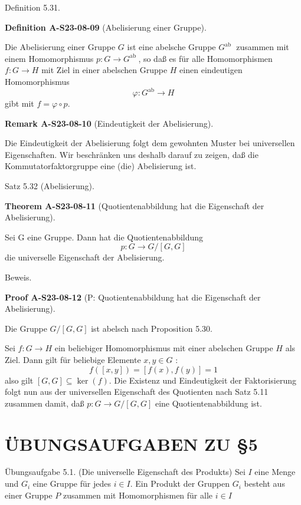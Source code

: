 \documentclass[10pt, letterpaper]{article}
\newcommand{\CustomHeading}[3]{%
  \par\medskip\noindent%
  \textbf{#1 #2} \textnormal{(#3)}.\enskip%
}
\newenvironment{DEF}[2]{\begin{unitbox}\CustomHeading{Definition}{#1}{#2}}{\end{unitbox}}
\newenvironment{THEO}[2]{\begin{unitbox}\CustomHeading{Theorem}{#1}{#2}}{\end{unitbox}}
\newenvironment{REM}[2]{\begin{unitbox}\CustomHeading{Remark}{#1}{#2}}{\end{unitbox}}
\newenvironment{PROOF}[2]{\begin{unitbox}\CustomHeading{Proof}{#1}{#2}}{\end{unitbox}}
\begin{document}
Definition 5.31. 

\begin{DEF}{A-S23-08-09}{Abelisierung einer Gruppe}
Die Abelisierung einer Gruppe $G$ ist eine abelsche Gruppe $G^{\text {ab }}$ zusammen mit einem Homomorphismus $p: G \rightarrow G^{\text {ab }}$, so daß es für alle Homomorphismen $f: G \rightarrow H$ mit Ziel in einer abelschen Gruppe $H$ einen eindeutigen Homomorphismus
$$
\varphi: G^{\mathrm{ab}} \rightarrow H
$$
gibt mit $f=\varphi \circ p$.
\end{DEF}


\begin{REM}{A-S23-08-10}{Eindeutigkeit der Abelisierung}
Die Eindeutigkeit der Abelisierung folgt dem gewohnten Muster bei universellen Eigenschaften. Wir beschränken uns deshalb darauf zu zeigen, daß die Kommutatorfaktorgruppe eine (die) Abelisierung ist.
\end{REM}

Satz 5.32 (Abelisierung). 

\begin{THEO}{A-S23-08-11}{Quotientenabbildung hat die Eigenschaft der Abelisierung}
Sei G eine Gruppe. Dann hat die Quotientenabbildung
$$
p: G \rightarrow G /[G, G]
$$
die universelle Eigenschaft der Abelisierung.
\end{THEO}

Beweis. 

\begin{PROOF}{A-S23-08-12}{P: Quotientenabbildung hat die Eigenschaft der Abelisierung}
Die Gruppe $G /[G, G]$ ist abelsch nach Proposition 5.30.

Sei $f: G \rightarrow H$ ein beliebiger Homomorphismus mit einer abelschen Gruppe $H$ als Ziel. Dann gilt für beliebige Elemente $x, y \in G$ :
$$
f([x, y])=[f(x), f(y)]=1
$$
also gilt $[G, G] \subseteq \operatorname{ker}(f)$. Die Existenz und Eindeutigkeit der Faktorisierung folgt nun aus der universellen Eigenschaft des Quotienten nach Satz 5.11 zusammen damit, daß $p: G \rightarrow G /[G, G]$ eine Quotientenabbildung ist.
\end{PROOF}



\section*{ÜBUNGSAUFGABEN ZU §5}
Übungsaufgabe 5.1. (Die universelle Eigenschaft des Produkts) Sei $I$ eine Menge und $G_{i}$ eine Gruppe für jedes $i \in I$. Ein Produkt der Gruppen $G_{i}$ besteht aus einer Gruppe $P$ zusammen mit Homomorphismen für alle $i \in I$
\end{document}
